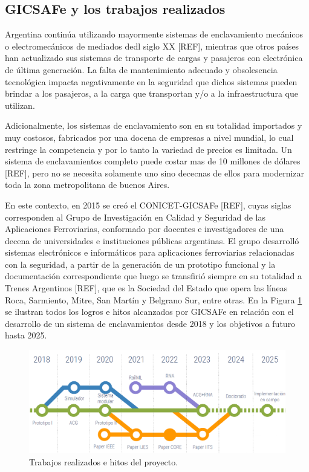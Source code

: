 \subsection{GICSAFe y los trabajos realizados}

    Argentina continúa utilizando mayormente sistemas de enclavamiento mecánicos o electromecánicos de mediados dedl siglo XX [REF], mientras que otros países han actualizado sus sistemas de transporte de cargas y pasajeros con electrónica de última generación. La falta de mantenimiento adecuado y obsolesencia tecnológica impacta negativamente en la seguridad que dichos sistemas pueden brindar a los pasajeros, a la carga que transportan y/o a la infraestructura que utilizan.

    Adicionalmente, los sistemas de enclavamiento son en su totalidad importados y muy costosos, fabricados por una docena de empresas a nivel mundial, lo cual restringe la competencia y por lo tanto la variedad de precios es limitada. Un sistema de enclavamientos completo puede costar mas de 10 millones de dólares [REF], pero no se necesita solamente uno sino dececnas de ellos para modernizar toda la zona metropolitana de buenos Aires.

    En este contexto, en 2015 se creó el CONICET-GICSAFe [REF], cuyas siglas corresponden al Grupo de Investigación en Calidad y Seguridad de las Aplicaciones Ferroviarias, conformado por docentes e investigadores de una decena de universidades e instituciones públicas argentinas. El grupo desarrolló sistemas electrónicos e informáticos para aplicaciones ferroviarias relacionadas con la seguridad, a partir de la generación de un prototipo funcional y la documentación correspondiente que luego se transfirió siempre en su totalidad a Trenes Argentinos [REF], que es la Sociedad del Estado que opera las líneas Roca, Sarmiento, Mitre, San Martín y Belgrano Sur, entre otras. En la Figura \ref{fig:contexto} se ilustran todos los logros e hitos alcanzados por GICSAFe en relación con el desarrollo de un sistema de enclavamientos desde 2018 y los objetivos a futuro hasta 2025.

    \begin{figure}[h]
        \centering
        \includegraphics[width=1\textwidth]{Figuras/HojaDeRuta}
        \centering\caption{Trabajos realizados e hitos del proyecto.}
        \label{fig:contexto}
    \end{figure}

